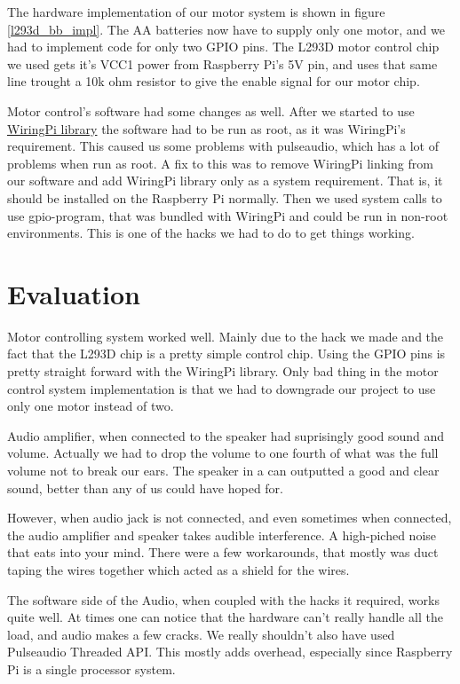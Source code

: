 \documentclass[english,11pt,twoside,a4paper]{article}
\begin{document}
The hardware implementation of our motor system is shown in figure \ref{l293d_bb_impl}. The AA batteries now have to supply only one motor, and we had to implement code for only two GPIO pins. The L293D motor control chip we used gets it's VCC1 power from Raspberry Pi's 5V pin, and uses that same line trought a 10k ohm resistor to give the enable signal for our motor chip.

Motor control's software had some changes as well. After we started to use \href{http://wiringpi.com}{WiringPi library} the software had to be run as root, as it was WiringPi's requirement. This caused us some problems with pulseaudio, which has a lot of problems when run as root. A fix to this was to remove WiringPi linking from our software and add WiringPi library only as a system requirement. That is, it should be installed on the Raspberry Pi normally. Then we used system calls to use gpio-program, that was bundled with WiringPi and could be run in non-root environments. This is one of the hacks we had to do to get things working.

\section{Evaluation}

Motor controlling system worked well. Mainly due to the hack we made and the fact that the L293D chip is a pretty simple control chip. Using the GPIO pins is pretty straight forward with the WiringPi library. Only bad thing in the motor control system implementation is that we had to downgrade our project to use only one motor instead of two.

Audio amplifier, when connected to the speaker had suprisingly good sound and volume. Actually we had to drop the volume to one fourth of what was the full volume not to break our ears. The speaker in a can outputted a good and clear sound, better than any of us could have hoped for.

However, when audio jack is not connected, and even sometimes when connected, the audio amplifier and speaker takes audible interference. A high-piched noise that eats into your mind. There were a few workarounds, that mostly was duct taping the wires together which acted as a shield for the wires.

The software side of the Audio, when coupled with the hacks it required, works quite well. At times one can notice that the hardware can't really handle all the load, and audio makes a few cracks. We really shouldn't also have used Pulseaudio Threaded API. This mostly adds overhead, especially since Raspberry Pi is a single processor system.
\end{document}
